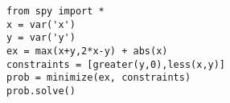 \begin{verbatim}
from spy import *
x = var('x')
y = var('y')
ex = max(x+y,2*x-y) + abs(x)
constraints = [greater(y,0),less(x,y)]
prob = minimize(ex, constraints)
prob.solve()
\end{verbatim}
